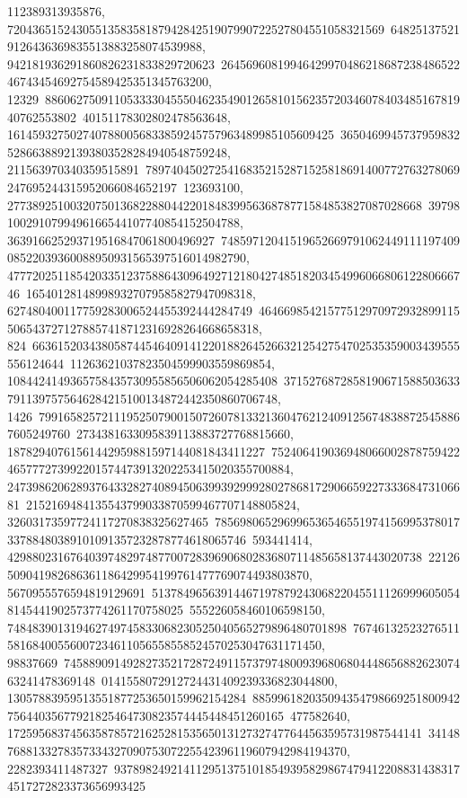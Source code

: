 {{{112389313935876, 720436515243055135835818794284251907990722527804551058321569\
648251375219126436369835513883258074539988, 942181936291860826231833829720623\
2645696081994642997048621868723848652246743454692754589425351345763200, 12329\
88606275091105333304555046235490126581015623572034607840348516781940762553802\
40151178302802478563648, 1614593275027407880056833859245757963489985105609425\
365046994573795983252866388921393803528284940548759248, 211563970340359515891\
78974045027254168352152871525818691400772763278069247695244315952066084652197\
123693100, 277389251003207501368228804422018483995636878771584853827087028668\
397981002910799496166544107740854152504788, 363916625293719516847061800496927\
7485971204151965266979106244911119740908522039360088950931565397516014982790, 
   47772025118542033512375886430964927121804274851820345499606680612280666746\
165401281489989327079585827947098318, 627480400117759283006524455392444284749\
464669854215775129709729328991155065437271278857418712316928264668658318, 824\
66361520343805874454640914122018826452663212542754702535359003439555556124644\
11263621037823504599903559869854, 1084424149365758435730955856506062054285408\
37152768728581906715885036337911397575646284215100134872442350860706748, 1426\
79916582572111952507900150726078133213604762124091256748388725458867605249760\
2734381633095839113883727768815660, 18782940761561442959881597144081843411227\
752406419036948066002878759422465777273992201574473913202253415020355700884, 
   24739862062893764332827408945063993929992802786817290665922733368473106681\
2152169484135543799033870599467707148805824, 32603173597724117270838325627465\
78569806529699653654655197415699537801733788480389101091357232878774618065746\
593441414, 429880231676403974829748770072839690680283680711485658137443020738\
22126509041982686361186429954199761477769074493803870, 5670955576594819129691\
51378496563914467197879243068220455111269996050548145441902573774261170758025\
555226058460106598150, 748483901319462749745833068230525040565279896480701898\
7674613252327651158168400556007234611056558558524570253047631171450, 98837669\
74588909149282735217287249115737974800939680680444865688262307463241478369148\
0141558072912724431409239336823044800, 13057883959513551877253650159962154284\
88599618203509435479866925180094275644035677921825464730823574445448451260165\
477582640, 172595683745635878572162528153565013127327477644563595731987544141\
34148768813327835733432709075307225542396119607942984194370, 2282393411487327\
93789824921411295137510185493958298674794122088314383174517272823373656993425\
}}}
